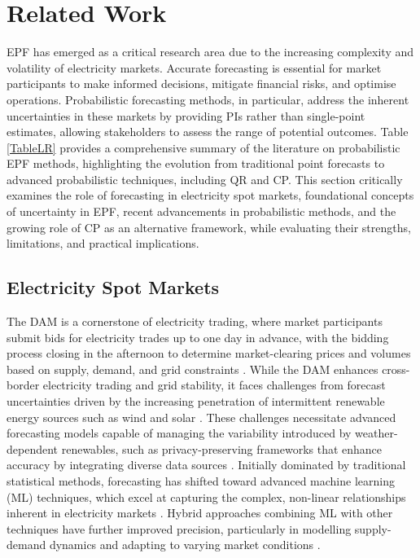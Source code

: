 \section{Related Work}
\label{pepfliteraturereview}
EPF has emerged as a critical research area due to the increasing complexity and volatility of electricity markets. Accurate forecasting is essential for market participants to make informed decisions, mitigate financial risks, and optimise operations. Probabilistic forecasting methods, in particular, address the inherent uncertainties in these markets by providing PIs rather than single-point estimates, allowing stakeholders to assess the range of potential outcomes. Table \ref{TableLR} provides a comprehensive summary of the literature on probabilistic EPF methods, highlighting the evolution from traditional point forecasts to advanced probabilistic techniques, including QR and CP. This section critically examines the role of forecasting in electricity spot markets, foundational concepts of uncertainty in EPF, recent advancements in probabilistic methods, and the growing role of CP as an alternative framework, while evaluating their strengths, limitations, and practical implications.

\subsection{Electricity Spot Markets}
The DAM is a cornerstone of electricity trading, where market participants submit bids for electricity trades up to one day in advance, with the bidding process closing in the afternoon to determine market-clearing prices and volumes based on supply, demand, and grid constraints \cite{newbery2016benefits, ilea2018european}. 
While the DAM enhances cross-border electricity trading and grid stability, it faces challenges from forecast uncertainties driven by the increasing penetration of intermittent renewable energy sources such as wind and solar \cite{miraki2025probabilistic}. These challenges necessitate advanced forecasting models capable of managing the variability introduced by weather-dependent renewables, such as privacy-preserving frameworks that enhance accuracy by integrating diverse data sources \cite{liu2025probabilistic}. Initially dominated by traditional statistical methods, forecasting has shifted toward advanced machine learning (ML) techniques, which excel at capturing the complex, non-linear relationships inherent in electricity markets \cite{ugurlu2018electricity, lago2018forecasting, chen2019brim, li2021day}. Hybrid approaches combining ML with other techniques have further improved precision, particularly in modelling supply-demand dynamics and adapting to varying market conditions \cite{lago2021forecasting, elrobrini2024federated}.

